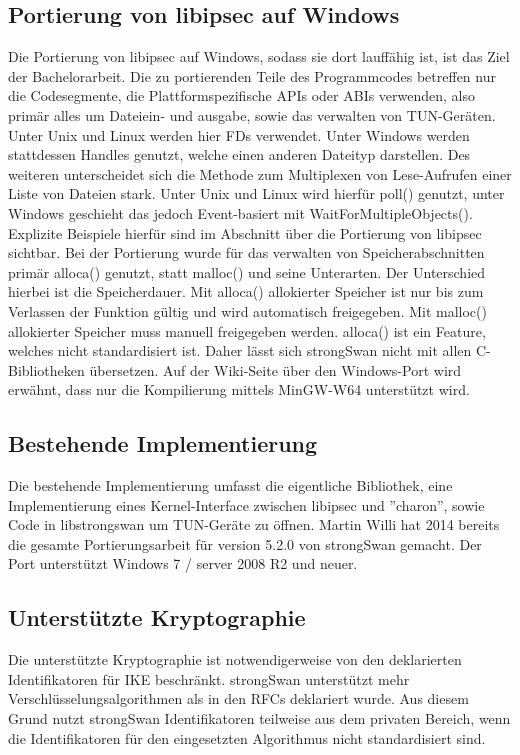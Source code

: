 \subsection{Portierung von libipsec auf Windows}
Die Portierung von libipsec auf Windows, sodass sie dort lauffähig ist, ist das Ziel
der Bachelorarbeit. Die zu portierenden Teile des Programmcodes betreffen nur
die Codesegmente, die Plattformspezifische \acp{API} oder \acp{ABI} verwenden,
also primär alles um Dateiein- und ausgabe, sowie das verwalten von TUN-Geräten.
Unter Unix und Linux werden hier \acp{FD} verwendet. Unter Windows werden stattdessen
Handles genutzt, welche einen anderen Dateityp darstellen. Des weiteren unterscheidet
sich die Methode zum Multiplexen von Lese-Aufrufen einer Liste von Dateien stark.
Unter Unix und Linux wird hierfür poll() genutzt, unter Windows geschieht das jedoch
Event-basiert mit WaitForMultipleObjects().
Explizite Beispiele hierfür sind im Abschnitt über die Portierung von libipsec sichtbar.
Bei der Portierung wurde für das verwalten von Speicherabschnitten 
primär alloca() genutzt, statt malloc() und seine Unterarten. Der Unterschied hierbei ist die
Speicherdauer. Mit alloca() allokierter Speicher ist nur bis zum Verlassen der Funktion gültig
und wird automatisch freigegeben. Mit malloc() allokierter Speicher muss manuell freigegeben werden.
alloca() ist ein Feature, welches nicht standardisiert ist.
Daher lässt sich strongSwan nicht mit allen C-Bibliotheken übersetzen.
Auf der Wiki-Seite über den Windows-Port wird erwähnt, dass nur die Kompilierung
mittels MinGW-W64 unterstützt wird.


\subsection{Bestehende Implementierung}
Die bestehende Implementierung umfasst die eigentliche Bibliothek, eine Implementierung
eines Kernel-Interface zwischen libipsec und ''charon'', sowie Code in libstrongswan
um TUN-Geräte zu öffnen. Martin Willi hat 2014 bereits die gesamte Portierungsarbeit
für version 5.2.0 von strongSwan gemacht. Der Port unterstützt Windows 7 / server 2008 R2
und neuer.

\subsection{Unterstützte Kryptographie}
Die unterstützte Kryptographie ist notwendigerweise von den deklarierten Identifikatoren
für IKE beschränkt. strongSwan unterstützt mehr Verschlüsselungsalgorithmen als
in den \acp{RFC} deklariert wurde. Aus diesem Grund nutzt strongSwan Identifikatoren
teilweise aus dem privaten Bereich, wenn die Identifikatoren für den eingesetzten Algorithmus
nicht standardisiert sind.

